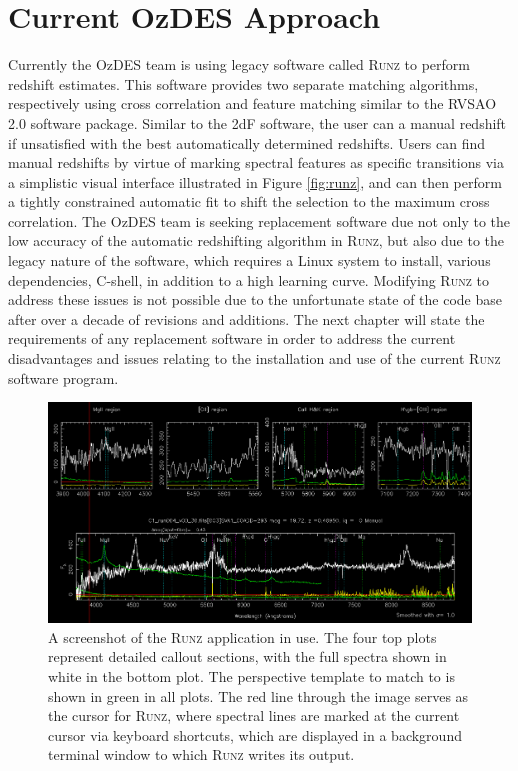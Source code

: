 \documentclass[titlesmallcaps, examinerscopy, copyrightpage]{uqthesis}
\newcommand{\runz}{\textsc{Runz}}
\begin{document}
\section{Current OzDES Approach}

Currently the OzDES team is using legacy software called \textsc{Runz} to perform redshift estimates. This software provides two separate matching algorithms, respectively using cross correlation and feature matching similar to the RVSAO 2.0 software package. Similar to the 2dF software, the user can a manual redshift if unsatisfied with the best automatically determined redshifts. Users can find manual redshifts by virtue of marking spectral features as specific transitions via a simplistic visual interface illustrated in Figure \ref{fig:runz}, and can then perform a tightly constrained  automatic fit to shift the selection to the maximum cross correlation. The OzDES team is seeking replacement software due not only to the low accuracy of the automatic redshifting algorithm in \textsc{Runz}, but also due to the legacy nature of the software, which requires a Linux system to install, various dependencies, C-shell, in addition to a high learning curve. Modifying \textsc{Runz} to address these issues is not possible due to the unfortunate state of the code base after over a decade of revisions and additions. The next chapter will state the requirements of any replacement software in order to address the current disadvantages and issues relating to the installation and use of the current \textsc{Runz} software program.

\begin{figure}[ht!]
\includegraphics[width=1\textwidth]{images/RunzScreen.PNG} 
\centering
\caption{A screenshot of the \runz{} application in use. The four top plots represent detailed callout sections, with the full spectra shown in white in the bottom plot. The perspective template to match to is shown in green in all plots. The red line through the image serves as the cursor for \runz{}, where spectral lines are marked at the current cursor via keyboard shortcuts, which are displayed in a background terminal window to which \runz{} writes its output.}
\label{fig:dust}
\end{figure}
\end{document}
